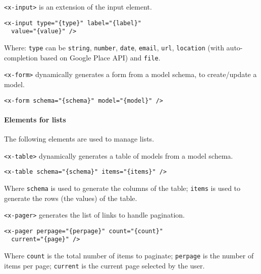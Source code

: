 \vspace{0.2cm}

\texttt{<x-input>} is an extension of the input element. 

\begin{lstlisting}[language=HTML5]
<x-input type="{type}" label="{label}"
  value="{value}" />
\end{lstlisting}

Where: 
\texttt{type} can be \texttt{string}, \texttt{number}, \texttt{date}, \texttt{email}, \texttt{url}, \texttt{location} (with auto-completion based on Google Place API) and \texttt{file}.

\vspace{0.2cm}

\texttt{<x-form>}  dynamically generates a form from a model schema, to create/update a model.

\begin{lstlisting}[language=HTML5]
<x-form schema="{schema}" model="{model}" />
\end{lstlisting}

\paragraph{Elements for lists}

The following elements are used to manage lists. 

\vspace{0.2cm}

\texttt{<x-table>}  dynamically generates a table of models from a model schema. 

\begin{lstlisting}[language=HTML5]
<x-table schema="{schema}" items="{items}" />
\end{lstlisting}

Where \texttt{schema} is used to generate the columns of the table; 
\texttt{items} is used to generate the rows (the values) of the table.

\vspace{0.2cm}

\texttt{<x-pager>} generates the list of links to handle pagination.

\begin{lstlisting}[language=HTML5]
<x-pager perpage="{perpage}" count="{count}" 
  current="{page}" />
\end{lstlisting}

Where \texttt{count} is the total number of items to paginate; 
\texttt{perpage} is the number of items per page; 
\texttt{current} is the current page selected by the user.

